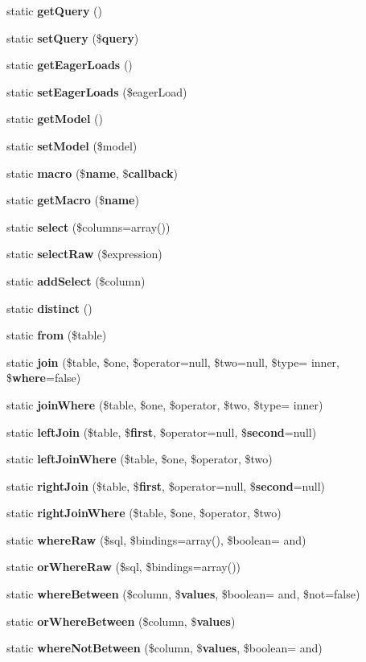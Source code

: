 \begin{DoxyCompactItemize}
\item 
static {\bf get\+Query} ()
\item 
static {\bf set\+Query} (\${\bf query})
\item 
static {\bf get\+Eager\+Loads} ()
\item 
static {\bf set\+Eager\+Loads} (\$eager\+Load)
\item 
static {\bf get\+Model} ()
\item 
static {\bf set\+Model} (\$model)
\item 
static {\bf macro} (\${\bf name}, \${\bf callback})
\item 
static {\bf get\+Macro} (\${\bf name})
\item 
static {\bf select} (\$columns=array())
\item 
static {\bf select\+Raw} (\$expression)
\item 
static {\bf add\+Select} (\$column)
\item 
static {\bf distinct} ()
\item 
static {\bf from} (\$table)
\item 
static {\bf join} (\$table, \$one, \$operator=null, \$two=null, \$type= \textquotesingle{}inner\textquotesingle{}, \${\bf where}=false)
\item 
static {\bf join\+Where} (\$table, \$one, \$operator, \$two, \$type= \textquotesingle{}inner\textquotesingle{})
\item 
static {\bf left\+Join} (\$table, \${\bf first}, \$operator=null, \${\bf second}=null)
\item 
static {\bf left\+Join\+Where} (\$table, \$one, \$operator, \$two)
\item 
static {\bf right\+Join} (\$table, \${\bf first}, \$operator=null, \${\bf second}=null)
\item 
static {\bf right\+Join\+Where} (\$table, \$one, \$operator, \$two)
\item 
static {\bf where\+Raw} (\$sql, \$bindings=array(), \$boolean= \textquotesingle{}and\textquotesingle{})
\item 
static {\bf or\+Where\+Raw} (\$sql, \$bindings=array())
\item 
static {\bf where\+Between} (\$column, \${\bf values}, \$boolean= \textquotesingle{}and\textquotesingle{}, \$not=false)
\item 
static {\bf or\+Where\+Between} (\$column, \${\bf values})
\item 
static {\bf where\+Not\+Between} (\$column, \${\bf values}, \$boolean= \textquotesingle{}and\textquotesingle{})

\end{DoxyCompactItemize}
